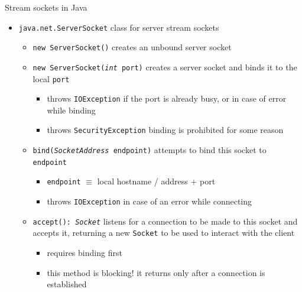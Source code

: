 \documentclass[presentation]{beamer}\mode<presentation>{\usetheme{AMSBolognaFC}}
\begin{document}
\begin{frame}[c, allowframebreaks]{Stream sockets in Java}
\begin{itemize}
\begin{itemize}
        \end{itemize}

        \framebreak

        \item \texttt{java.net.\alert{ServerSocket}} class for \alert{server} stream sockets 
        \begin{itemize}
            \item \alert{\texttt{new ServerSocket()}} creates an unbound server socket
            \item \alert{\texttt{new ServerSocket(\textit{int} port)}} creates a server socket and binds it to the local \texttt{port}
            \begin{itemize}
                \item throws \texttt{IOException} if the port is already busy, or in case of error while binding
                \item throws \texttt{SecurityException} binding is prohibited for some reason
            \end{itemize}

            \item \alert{\texttt{bind(\textit{SocketAddress} endpoint)}} attempts to bind this socket to \texttt{endpoint}
            \begin{itemize}
                \item \texttt{endpoint} $\equiv$ local hostname / address + port
                \item throws \texttt{IOException} in case of an error while connecting
            \end{itemize}

            \item \alert{\texttt{accept(): \textit{Socket}}} listens for a connection to be made to this socket and accepts it, returning a new \texttt{Socket} to be used to interact with the client
            \begin{itemize}
                \item requires binding first
                \item this method is blocking! it returns only after a connection is established
            \end{itemize}

            \framebreak


\end{itemize}
\end{itemize}
\end{frame}
\end{document}
